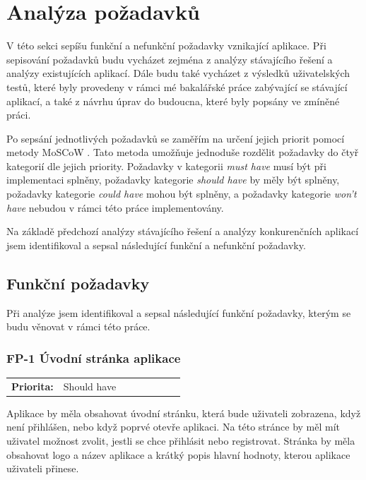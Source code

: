 ﻿%
\section{Analýza požadavků}

V této sekci sepíšu funkční a nefunkční požadavky vznikající aplikace. Při sepisování požadavků budu vycházet zejména z analýzy stávajícího řešení a analýzy existujících aplikací. Dále budu také vycházet z výsledků uživatelských testů, které byly provedeny v rámci mé bakalářské práce \cite{Jenicek2024BachelorThesis} zabývající se stávající aplikací, a také z návrhu úprav do budoucna, které byly popsány ve zmíněné práci.

Po sepsání jednotlivých požadavků se zaměřím na určení jejich priorit pomocí metody MoSCoW \cite{Moscow}. Tato metoda umožňuje jednoduše rozdělit požadavky do čtyř kategorií dle jejich priority. Požadavky v kategorii \textit{must have} musí být při implementaci splněny, požadavky kategorie \textit{should have} by měly být splněny, požadavky kategorie \textit{could have} mohou být splněny, a požadavky kategorie \textit{won't have} nebudou v rámci této práce implementovány.

Na základě předchozí analýzy stávajícího řešení a analýzy konkurenčních aplikací jsem identifikoval a sepsal následující funkční a nefunkční požadavky.

\subsection{Funkční požadavky}

Při analýze jsem identifikoval a sepsal následující funkční požadavky, kterým se budu věnovat v rámci této práce.

\subsubsection{FP-1 Úvodní stránka aplikace}\label{sec:fp-welcome-page}

\begin{tabular}{lp{0.7\linewidth}}
    \textbf{Priorita:} & Should have \\
\end{tabular}

Aplikace by měla obsahovat úvodní stránku, která bude uživateli zobrazena, když není přihlášen, nebo když poprvé otevře aplikaci. Na této stránce by měl mít uživatel možnost zvolit, jestli se chce přihlásit nebo registrovat. Stránka by měla obsahovat logo a název aplikace a krátký popis hlavní hodnoty, kterou aplikace uživateli přinese.

